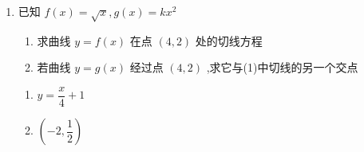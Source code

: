 \begin{enumerate}
\begin{jieda}
\begin{enumerate}
            综上, $f\left( x\right)$ 的单调递增区间为 $\left( {-\infty , - 2}\right) ,\left( {2, + \infty }\right)$ ,单调递减区间为$(-2,2)$，故函数 $f\left( x\right)$ 有极大值为 $\dfrac{28}{3}$ ,有极小值为 $- \dfrac{4}{3}$ 
            
            \item 由(1)得 $f\left( x\right)$ 在 $\left\lbrack  {0,2}\right\rbrack$ 上单调递减,在 $(2,3\rbrack$ 上单调递增,
            又 $f\left( 0\right)  = 4,f\left( 3\right)  = \dfrac{1}{3} \times  {3}^{3} - 4 \times  3 + 4 = 1$ ,
            又函数 $f\left( x\right)$ 的极小值为 $f\left( 2\right)  =  - \dfrac{4}{3}$，所以当 $x \in  \left\lbrack  {0,3}\right\rbrack$ 时,函数 $f\left( x\right)$ 的最大值为 4 ,最小值为 $- \dfrac{4}{3}$.
        \end{enumerate}
    \end{jieda}
    
    \item 已知 ${f}\left( {x}\right)  = \sqrt{{x}},{g}\left( {x}\right)  = {k}{{x}}^{2}$ 
    \begin{enumerate}
        \item 求曲线 ${y} = {f}\left( {x}\right)$ 在点 $\left( {{4},{2}}\right)$ 处的切线方程
        \item 若曲线 $y = g\left( x\right)$ 经过点 $\left( {4,2}\right)$ ,求它与(1)中切线的另一个交点
    \end{enumerate}
    \begin{jieda}
        \begin{enumerate}
            \item $y = \dfrac{x}{4}+1$
            \item $\left(-2, \dfrac{1}{2}\right)$
        \end{enumerate}
    \end{jieda}
    

\end{enumerate}
